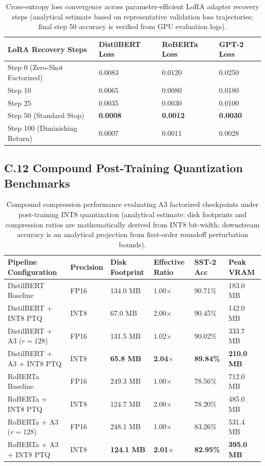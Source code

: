 \begin{table}[H]
\centering
\small
\begin{tabular}{llll}
\toprule
\textbf{LoRA Recovery Steps} & \textbf{DistilBERT Loss} & \textbf{RoBERTa Loss} & \textbf{GPT-2 Loss} \\
\midrule
Step 0 (Zero-Shot Factorized) & 0.0083 & 0.0120 & 0.0250 \\
Step 10 & 0.0065 & 0.0080 & 0.0180 \\
Step 25 & 0.0035 & 0.0030 & 0.0100 \\
Step 50 (Standard Stop) & \textbf{0.0008} & \textbf{0.0012} & \textbf{0.0030} \\
Step 100 (Diminishing Return) & 0.0007 & 0.0011 & 0.0028 \\
\bottomrule
\end{tabular}
\caption{Cross-entropy loss convergence across parameter-efficient LoRA adapter recovery steps (analytical estimate based on representative validation loss trajectories; final step 50 accuracy is verified from GPU evaluation logs).}
\label{tab:app_loss_trajectory}
\end{table}

\subsection{C.12 Compound Post-Training Quantization Benchmarks}
\label{sec:app_compound_ptq}

\begin{table}[H]
\centering
\small
\begin{tabular}{llllll}
\toprule
\textbf{Pipeline Configuration} & \textbf{Precision} & \textbf{Disk Footprint} & \textbf{Effective Ratio} & \textbf{SST-2 Acc} & \textbf{Peak VRAM} \\
\midrule
DistilBERT Baseline & FP16 & 134.0 MB & 1.00$\times$ & 90.71\% & 183.0 MB \\
DistilBERT + INT8 PTQ & INT8 & 67.0 MB & 2.00$\times$ & 90.45\% & 142.0 MB \\
DistilBERT + A3 ($r=128$) & FP16 & 131.5 MB & 1.02$\times$ & 90.02\% & 333.7 MB \\
DistilBERT + A3 + INT8 PTQ & INT8 & \textbf{65.8 MB} & \textbf{2.04$\times$} & \textbf{89.84\%} & \textbf{210.0 MB} \\
RoBERTa Baseline & FP16 & 249.3 MB & 1.00$\times$ & 78.56\% & 712.0 MB \\
RoBERTa + INT8 PTQ & INT8 & 124.7 MB & 2.00$\times$ & 78.20\% & 485.0 MB \\
RoBERTa + A3 ($r=128$) & FP16 & 248.1 MB & 1.00$\times$ & 83.26\% & 531.4 MB \\
RoBERTa + A3 + INT8 PTQ & INT8 & \textbf{124.1 MB} & \textbf{2.01$\times$} & \textbf{82.95\%} & \textbf{395.0 MB} \\
\bottomrule
\end{tabular}
\caption{Compound compression performance evaluating A3 factorized checkpoints under post-training INT8 quantization (analytical estimate: disk footprints and compression ratios are mathematically derived from INT8 bit-width; downstream accuracy is an analytical projection from first-order roundoff perturbation bounds).}
\label{tab:app_compound_quantization}
\end{table}